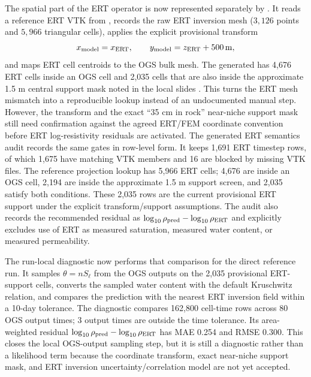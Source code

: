 The spatial part of the ERT operator is now represented separately by
.  It reads a reference ERT VTK from
, records the raw ERT inversion mesh
(\(3{,}126\) points and \(5{,}966\) triangular cells), applies the explicit provisional
transform
\[
x_{\rm model}=x_{\rm ERT}, \qquad y_{\rm model}=z_{\rm ERT}+500\,{\rm m},
\]
and maps ERT cell centroids to the OGS bulk mesh.  The generated
 has 4,676 ERT cells inside an OGS cell and
2,035 cells that are also inside the approximate 1.5 m central support mask noted in
the local slides \cite[PDF pp.~16--18]{CDAModellingSlides2025}.  This turns the ERT
mesh mismatch into a reproducible lookup instead of an undocumented manual step.
However, the transform and the exact ``35 cm in rock'' near-niche support mask still
need confirmation against the agreed ERT/FEM coordinate convention before ERT
log-resistivity residuals are activated.
The generated ERT semantics audit
records the same gates in row-level form.  It keeps 1,691 ERT timestep rows, of
which 1,675 have matching VTK members and 16 are blocked by missing VTK files.  The
reference projection lookup has 5,966 ERT cells; 4,676 are inside an OGS cell,
2,194 are inside the approximate 1.5 m support screen, and 2,035 satisfy both
conditions.  These 2,035 rows are the current provisional ERT support under the
explicit transform/support assumptions.  The audit also records the recommended
residual as \(\log_{10}\rho_{\rm pred}-\log_{10}\rho_{\rm ERT}\) and explicitly
excludes use of ERT as measured saturation, measured water content, or measured
permeability.

The run-local diagnostic
now performs that comparison for the direct reference run.  It samples
\(\theta=nS_\ell\) from the OGS outputs on the 2,035 provisional ERT-support cells,
converts the sampled water content with the default Kruschwitz relation, and compares
the prediction with the nearest ERT inversion field within a 10-day tolerance.  The
diagnostic compares 162,800 cell-time rows across 80 OGS output times; 3 output times
are outside the time tolerance.  Its area-weighted residual
\(\log_{10}\rho_{\rm pred}-\log_{10}\rho_{\rm ERT}\) has MAE 0.254 and RMSE 0.300.
This closes the local OGS-output sampling step, but it is still a diagnostic rather
than a likelihood term because the coordinate transform, exact near-niche support
mask, and ERT inversion uncertainty/correlation model are not yet accepted.

